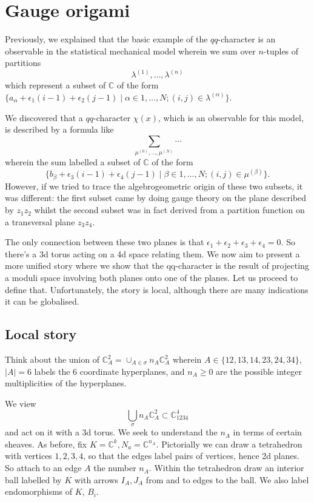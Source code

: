 \documentclass[leqno, openany]{memoir}
\theoremstyle{definition}
\theoremstyle{remark}
\theoremstyle{plain}
\theoremstyle{definition}
\theoremstyle{remark}
\begin{document}
\section{Gauge origami}

Previously, we explained that the basic example of the 
$qq$-character is an observable in the statistical mechanical 
model wherein we sum over $n$-tuples of partitions 
\[
\lambda^{(1)},\dots, \lambda^{(n)}
\]
which represent a subset of $\mathbb{C}$ of the form 
$\{ a_\alpha + \epsilon_1(i - 1) + \epsilon_2 (j - 1) \mid \alpha \in 1,\dots, N ; (i,j) \in \lambda^{(\alpha)}\}$.

We discovered that a $qq$-character $\chi(x)$, which is an observable 
for this model, is described by a formula like 
\[
\sum_{\mu^{(0)}, \dots,\mu^{(N)}} \cdots
\]
wherein the sum labelled a subset of $\mathbb{C}$ of the form 
\[
\{ b_\beta + \epsilon_3(i-1) + \epsilon_4(j-1) \mid \beta \in 1,\dots, N ; (i,j) \in \mu^{(\beta)}\}.
\]
However, if we tried to trace the algebrogeometric origin of these 
two subsets, it was different: 
the first subset came by doing gauge theory on the plane described by $z_1 z_2$
whilst the second subset was in fact derived 
from a partition function on a transversal plane $z_3 z_4$. 

The only connection between these two planes is that $\epsilon_1 + \epsilon_2 + \epsilon_3 + \epsilon_4 = 0$.
So there's a 3d torus acting on a 4d space relating them. 
We now aim to present a more unified story where we show that 
the qq-character is the result of projecting a moduli space 
involving both planes onto one of the planes. 
Let us proceed to define that. Unfortunately, the story is local, 
although there are many indications it can be globalised.

\subsection{Local story}

Think about the union of $\mathbb{C}^2_A = \cup_{A \in \sigma} n_A \mathbb{C}_A^2$
wherein $A \in \{12,13,14,23,24,34\}$, $|A| = 6 $ labels the 6 coordinate 
hyperplanes, and $n_A \geq 0$ are the possible integer multiplicities of the hyperplanes. 

We view 
\[
\bigcup_\sigma n_A \mathbb{C}_A^2 \subset \mathbb{C}^4_{1234}
\]
and act on it with a 3d torus. We seek to understand the $n_A$ in 
terms of certain sheaves.
As before, fix $K = \mathbb{C}^k, N_a = \mathbb{C}^{n_A}$.
Pictorially we can draw a tetrahedron with vertices $1,2,3,4$,
so that the edges label pairs of vertices, hence 2d planes. 
So attach to an edge $A$ the number $n_A$.  Within the tetrahedron
draw an interior ball labelled by $K$ with arrows $I_{A},J_A$ from and to edges to the ball. 
We also label endomorphisms of $K$, $B_i$. 
\end{document}

